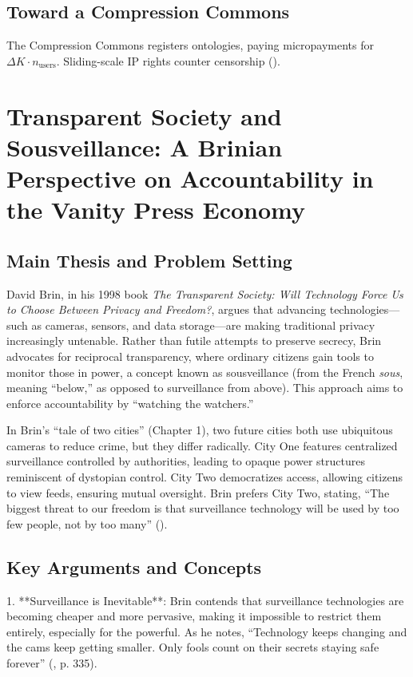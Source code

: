 \documentclass[12pt]{article}
\begin{document}
\subsection{Toward a Compression Commons}

The Compression Commons registers ontologies, paying micropayments for \(\Delta K \cdot n_{\text{users}}\). Sliding-scale IP rights counter censorship (\citealp{Harberger1965,Wiener1948,Bateson1972}).

\section{Transparent Society and Sousveillance: A Brinian Perspective on Accountability in the Vanity Press Economy}

\subsection{Main Thesis and Problem Setting}

David Brin, in his 1998 book \emph{The Transparent Society: Will Technology Force Us to Choose Between Privacy and Freedom?}, argues that advancing technologies—such as cameras, sensors, and data storage—are making traditional privacy increasingly untenable. Rather than futile attempts to preserve secrecy, Brin advocates for reciprocal transparency, where ordinary citizens gain tools to monitor those in power, a concept known as sousveillance (from the French \emph{sous}, meaning ``below,'' as opposed to surveillance from above). This approach aims to enforce accountability by ``watching the watchers.''

In Brin's ``tale of two cities'' (Chapter 1), two future cities both use ubiquitous cameras to reduce crime, but they differ radically. City One features centralized surveillance controlled by authorities, leading to opaque power structures reminiscent of dystopian control. City Two democratizes access, allowing citizens to view feeds, ensuring mutual oversight. Brin prefers City Two, stating, ``The biggest threat to our freedom is that surveillance technology will be used by too few people, not by too many'' (\citealp{Brin1998}).

\subsection{Key Arguments and Concepts}

1. **Surveillance is Inevitable**: Brin contends that surveillance technologies are becoming cheaper and more pervasive, making it impossible to restrict them entirely, especially for the powerful. As he notes, ``Technology keeps changing and the cams keep getting smaller. Only fools count on their secrets staying safe forever'' (\citealp{Brin1998}, p. 335).
\end{document}
